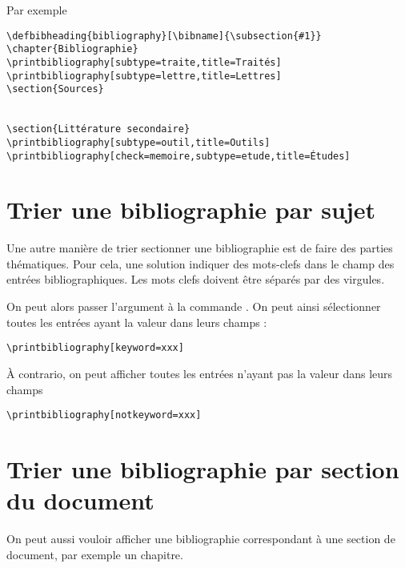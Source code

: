 Par exemple
\begin{verbatim}
\defbibheading{bibliography}[\bibname]{\subsection{#1}}
\chapter{Bibliographie}
\printbibliography[subtype=traite,title=Traités]
\printbibliography[subtype=lettre,title=Lettres]
\section{Sources}


\section{Littérature secondaire}
\printbibliography[subtype=outil,title=Outils]
\printbibliography[check=memoire,subtype=etude,title=Études]

\end{verbatim}

\section{Trier une bibliographie par sujet}

Une autre manière de trier sectionner une bibliographie est de faire des parties thématiques. Pour cela, une solution indiquer des mots-clefs dans le champ  des entrées bibliographiques. Les mots clefs doivent être séparés par des virgules.

On peut alors passer l'argument  à la commande . On peut ainsi sélectionner toutes les entrées ayant la valeur  dans leurs champs  :

\begin{verbatim}
\printbibliography[keyword=xxx]
\end{verbatim}

À contrario, on peut afficher toutes les entrées n'ayant pas la valeur  dans leurs champs 

\begin{verbatim}
\printbibliography[notkeyword=xxx]
\end{verbatim}

\section{Trier une bibliographie par section du document}

On peut aussi vouloir afficher une bibliographie correspondant à une section de document, par exemple un chapitre.
